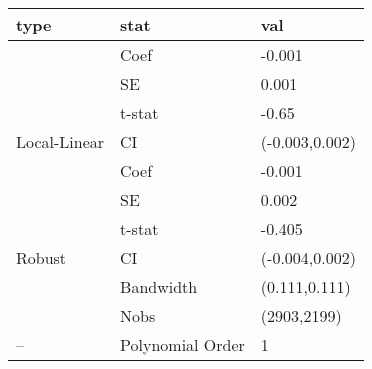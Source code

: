 
\begin{tabular}{lll}
\toprule
type & stat & val\\
\midrule
 & Coef & -0.001\\

 & SE & 0.001\\

 & t-stat & -0.65\\

\multirow{-4}{*}{\raggedright\arraybackslash Local-Linear} & CI & (-0.003,0.002)\\
\cmidrule{1-3}
 & Coef & -0.001\\

 & SE & 0.002\\

 & t-stat & -0.405\\

\multirow{-4}{*}{\raggedright\arraybackslash Robust} & CI & (-0.004,0.002)\\
\cmidrule{1-3}
 & Bandwidth & (0.111,0.111)\\

 & Nobs & (2903,2199)\\

\multirow{-3}{*}{\raggedright\arraybackslash --} & Polynomial Order & 1\\
\bottomrule
\end{tabular}